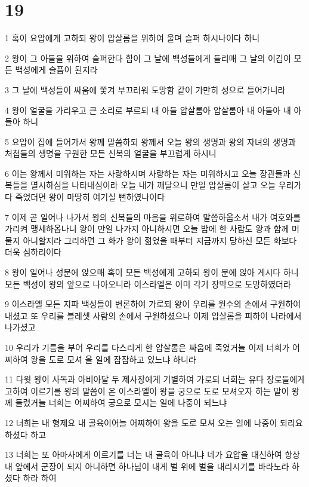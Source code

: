 \chapter{19}

\par 1 혹이 요압에게 고하되 왕이 압살롬을 위하여 울며 슬퍼 하시나이다 하니
\par 2 왕이 그 아들을 위하여 슬퍼한다 함이 그 날에 백성들에게 들리매 그 날의 이김이 모든 백성에게 슬픔이 된지라
\par 3 그 날에 백성들이 싸움에 쫓겨 부끄러워 도망함 같이 가만히 성으로 들어가니라
\par 4 왕이 얼굴을 가리우고 큰 소리로 부르되 내 아들 압살롬아 압살롬아 내 아들아 내 아들아 하니
\par 5 요압이 집에 들어가서 왕께 말씀하되 왕께서 오늘 왕의 생명과 왕의 자녀의 생명과 처첩들의 생명을 구원한 모든 신복의 얼굴을 부끄럽게 하시니
\par 6 이는 왕께서 미워하는 자는 사랑하시며 사랑하는 자는 미워하시고 오늘 장관들과 신복들을 멸시하심을 나타내심이라 오늘 내가 깨달으니 만일 압살롬이 살고 오늘 우리가 다 죽었더면 왕이 마땅히 여기실 뻔하였나이다
\par 7 이제 곧 일어나 나가서 왕의 신복들의 마음을 위로하여 말씀하옵소서 내가 여호와를 가리켜 맹세하옵나니 왕이 만일 나가지 아니하시면 오늘 밤에 한 사람도 왕과 함께 머물지 아니할지라 그리하면 그 화가 왕이 젊었을 때부터 지금까지 당하신 모든 화보다 더욱 심하리이다
\par 8 왕이 일어나 성문에 앉으매 혹이 모든 백성에게 고하되 왕이 문에 앉아 계시다 하니 모든 백성이 왕의 앞으로 나아오니라 이스라엘은 이미 각기 장막으로 도망하였더라
\par 9 이스라엘 모든 지파 백성들이 변론하여 가로되 왕이 우리를 원수의 손에서 구원하여 내셨고 또 우리를 블레셋 사람의 손에서 구원하셨으나 이제 압살롬을 피하여 나라에서 나가셨고
\par 10 우리가 기름을 부어 우리를 다스리게 한 압살롬은 싸움에 죽었거늘 이제 너희가 어찌하여 왕을 도로 모셔 올 일에 잠잠하고 있느냐 하니라
\par 11 다윗 왕이 사독과 아비아달 두 제사장에게 기별하여 가로되 너희는 유다 장로들에게 고하여 이르기를 왕의 말씀이 온 이스라엘이 왕을 궁으로 도로 모셔오자 하는 말이 왕께 들렸거늘 너희는 어찌하여 궁으로 모시는 일에 나중이 되느냐
\par 12 너희는 내 형제요 내 골육이어늘 어찌하여 왕을 도로 모셔 오는 일에 나중이 되리요 하셨다 하고
\par 13 너희는 또 아마사에게 이르기를 너는 내 골육이 아니냐 네가 요압을 대신하여 항상 내 앞에서 군장이 되지 아니하면 하나님이 내게 벌 위에 벌을 내리시기를 바라노라 하셨다 하라 하여
